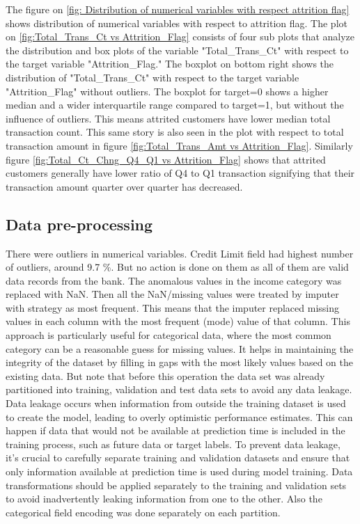 \documentclass[10pt,a4paper]{style}
\begin{document}
	The figure on \ref{fig: Distribution of numerical variables with respect attrition flag} shows distribution of numerical variables with respect to attrition flag. The plot on \ref{fig:Total_Trans_Ct vs Attrition_Flag} consists of four sub plots that analyze the distribution and box plots of the variable "Total\_Trans\_Ct" with respect to the target variable "Attrition\_Flag."  The boxplot on bottom right shows the distribution of "Total\_Trans\_Ct" with respect to the target variable "Attrition\_Flag" without outliers.  The boxplot for target=0  shows a higher median and a wider interquartile range compared to target=1, but without the influence of outliers. This means attrited customers have lower median total transaction count. This same story is also seen in the plot with respect to total transaction amount in figure \ref{fig:Total_Trans_Amt vs Attrition_Flag}. Similarly figure \ref{fig:Total_Ct_Chng_Q4_Q1 vs Attrition_Flag} shows that attrited customers generally have lower ratio of Q4 to Q1 transaction signifying that their transaction amount quarter over quarter has decreased. 
	
\subsection{Data pre-processing}
	There were outliers in numerical variables. Credit Limit field had highest number of outliers, around 9.7 \%. But no action is done on them as all of them are valid data records from the bank. The anomalous values in the income category was replaced with NaN. Then all the NaN/missing values were treated by imputer with strategy as most frequent. This means that the imputer replaced missing values in each column with the most frequent (mode) value of that column. This approach is particularly useful for categorical data, where the most common category can be a reasonable guess for missing values. It helps in maintaining the integrity of the dataset by filling in gaps with the most likely values based on the existing data. But note that before this operation the data set was already partitioned into training, validation and test data sets to avoid any data leakage. Data leakage occurs when information from outside the training dataset is used to create the model, leading to overly optimistic performance estimates. This can happen if data that would not be available at prediction time is included in the training process, such as future data or target labels. To prevent data leakage, it's crucial to carefully separate training and validation datasets and ensure that only information available at prediction time is used during model training. Data transformations should be applied separately to the training and validation sets to avoid inadvertently leaking information from one to the other. Also the categorical field encoding was done separately on each partition. 
\end{document}
